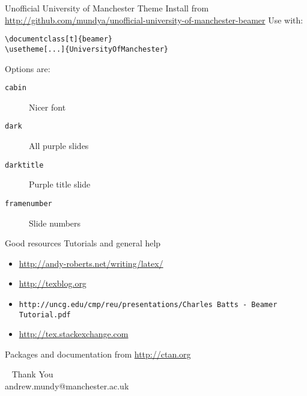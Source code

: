 \documentclass[t]{beamer}
\begin{document}
\begin{frame}{Unofficial University of Manchester Theme}
  Install from \url{http://github.com/mundya/unofficial-university-of-manchester-beamer}
\vfill
  Use with:
  \begin{verbatim}
\documentclass[t]{beamer}
\usetheme[...]{UniversityOfManchester}
  \end{verbatim}
\vfill
  Options are:
  \begin{description}
    \item[\texttt{cabin}] Nicer font
    \item[\texttt{dark}] All purple slides
    \item[\texttt{darktitle}] Purple title slide
    \item[\texttt{framenumber}] Slide numbers
  \end{description}
\end{frame}

\begin{darkframes}
  \begin{frame}{Good resources}
    Tutorials and general help
    \begin{itemize}
      \footnotesize
      \item \url{http://andy-roberts.net/writing/latex/}
      \item \url{http://texblog.org}
      \item \texttt{http://uncg.edu/cmp/reu/presentations/Charles Batts - Beamer Tutorial.pdf}
      \item \url{http://tex.stackexchange.com}
    \end{itemize}

    Packages and documentation from \url{http://ctan.org}
  \end{frame}

  \begin{frame}{~}
    \centering
    \vfill
    {\huge Thank You}\\
    andrew.mundy@manchester.ac.uk
    \vfill
  \end{frame}
\end{darkframes}
\end{document}
